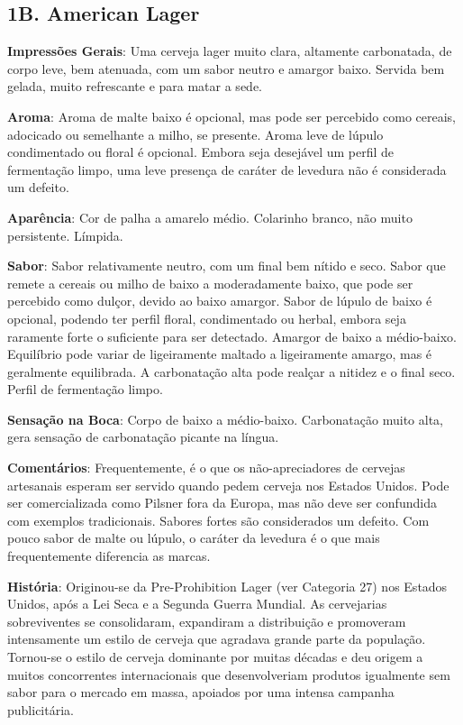 \subsection*{1B. American Lager}
\textbf{Impressões Gerais}: Uma cerveja lager muito clara, altamente carbonatada, de corpo leve, bem atenuada, com um sabor neutro e amargor baixo. Servida bem gelada, muito refrescante e para matar a sede.

\textbf{Aroma}: Aroma de malte baixo é opcional, mas pode ser percebido como cereais, adocicado ou semelhante a milho, se presente. Aroma leve de lúpulo condimentado ou floral é opcional. Embora seja desejável um perfil de fermentação limpo, uma leve presença de caráter de levedura não é considerada um defeito.

\textbf{Aparência}: Cor de palha a amarelo médio. Colarinho branco, não muito persistente. Límpida.

\textbf{Sabor}: Sabor relativamente neutro, com um final bem nítido e seco. Sabor que remete a cereais ou milho de baixo a moderadamente baixo, que pode ser percebido como dulçor, devido ao baixo amargor. Sabor de lúpulo de baixo é opcional, podendo ter perfil floral, condimentado ou herbal, embora seja raramente forte o suficiente para ser detectado. Amargor de baixo a médio-baixo. Equilíbrio pode variar de ligeiramente maltado a ligeiramente amargo, mas é geralmente equilibrada. A carbonatação alta pode realçar a nitidez e o final seco. Perfil de fermentação limpo.

\textbf{Sensação na Boca}: Corpo de baixo a médio-baixo. Carbonatação muito alta, gera sensação de carbonatação picante na língua.

\textbf{Comentários}: Frequentemente, é o que os não-apreciadores de cervejas artesanais esperam ser servido quando pedem cerveja nos Estados Unidos. Pode ser comercializada como Pilsner fora da Europa, mas não deve ser confundida com exemplos tradicionais. Sabores fortes são considerados um defeito. Com pouco sabor de malte ou lúpulo, o caráter da levedura é o que mais frequentemente diferencia as marcas.

\textbf{História}: Originou-se da Pre-Prohibition Lager (ver Categoria 27) nos Estados Unidos, após a Lei Seca e a Segunda Guerra Mundial. As cervejarias sobreviventes se consolidaram, expandiram a distribuição e promoveram intensamente um estilo de cerveja que agradava grande parte da população. Tornou-se o estilo de cerveja dominante por muitas décadas e deu origem a muitos concorrentes internacionais que desenvolveriam produtos igualmente sem sabor para o mercado em massa, apoiados por uma intensa campanha publicitária.


